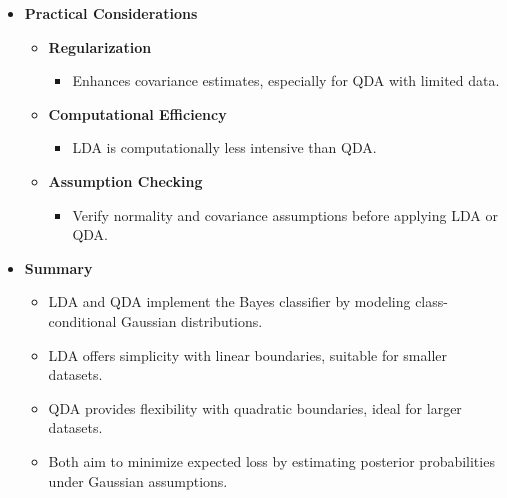 \documentclass[12pt]{article}
\begin{document}
\begin{itemize}
    \item \textbf{Practical Considerations}
    \begin{itemize}
        \item \textbf{Regularization}
        \begin{itemize}
            \item Enhances covariance estimates, especially for QDA with limited data.
        \end{itemize}
        \item \textbf{Computational Efficiency}
        \begin{itemize}
            \item LDA is computationally less intensive than QDA.
        \end{itemize}
        \item \textbf{Assumption Checking}
        \begin{itemize}
            \item Verify normality and covariance assumptions before applying LDA or QDA.
        \end{itemize}
    \end{itemize}
    
    \item \textbf{Summary}
    \begin{itemize}
        \item LDA and QDA implement the Bayes classifier by modeling class-conditional Gaussian distributions.
        \item LDA offers simplicity with linear boundaries, suitable for smaller datasets.
        \item QDA provides flexibility with quadratic boundaries, ideal for larger datasets.
        \item Both aim to minimize expected loss by estimating posterior probabilities under Gaussian assumptions.
    \end{itemize}
\end{itemize}
\end{document}
